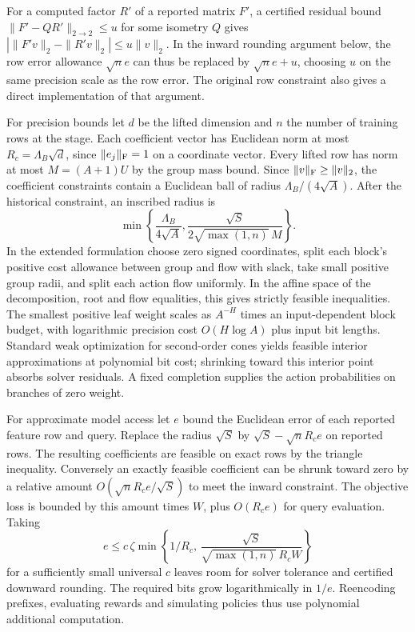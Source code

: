 For a computed factor $R'$ of a reported matrix $F'$, a certified residual bound $\|F'-QR'\|_{2\to2}\le u$ for some isometry $Q$ gives $|\|F'v\|_2-\|R'v\|_2|\le u\|v\|_2$. In the inward rounding argument below, the row error allowance $\sqrt n e$ can thus be replaced by $\sqrt n e+u$, choosing $u$ on the same precision scale as the row error. The original row constraint also gives a direct implementation of that argument.

For precision bounds let $d$ be the lifted dimension and $n$ the number of training rows at the stage. Each coefficient vector has Euclidean norm at most $R_c=\Lambda_B\sqrt d$, since $\lVert e_j\rVert_{\mathrm F}=1$ on a coordinate vector. Every lifted row has norm at most $M=(A+1)U$ by the group mass bound. Since $\lVert v\rVert_{\mathrm F}\ge\|v\|_2$, the coefficient constraints contain a Euclidean ball of radius $\Lambda_B/(4\sqrt A)$. After the historical constraint, an inscribed radius is
\[
 \min\!\left\{\frac{\Lambda_B}{4\sqrt A},
   \frac{\sqrt S}{2\sqrt{\max(1,n)}\,M}\right\}.
\]
In the extended formulation choose zero signed coordinates, split each block's positive cost allowance between group and flow with slack, take small positive group radii, and split each action flow uniformly. In the affine space of the decomposition, root and flow equalities, this gives strictly feasible inequalities. The smallest positive leaf weight scales as $A^{-H}$ times an input-dependent block budget, with logarithmic precision cost $O(H\log A)$ plus input bit lengths. Standard weak optimization for second-order cones yields feasible interior approximations at polynomial bit cost; shrinking toward this interior point absorbs solver residuals. A fixed completion supplies the action probabilities on branches of zero weight.

For approximate model access let $e$ bound the Euclidean error of each reported feature row and query. Replace the radius $\sqrt S$ by $\sqrt S-\sqrt n R_c e$ on reported rows. The resulting coefficients are feasible on exact rows by the triangle inequality. Conversely an exactly feasible coefficient can be shrunk toward zero by a relative amount $O(\sqrt n R_c e/\sqrt S)$ to meet the inward constraint. The objective loss is bounded by this amount times $W$, plus $O(R_c e)$ for query evaluation. Taking
\[
 e\le c\,\zeta\min\!\left\{1/R_c,\,
 \frac{\sqrt S}{\sqrt{\max(1,n)}\,R_cW}\right\}
\]
for a sufficiently small universal $c$ leaves room for solver tolerance and certified downward rounding. The required bits grow logarithmically in $1/e$. Reencoding prefixes, evaluating rewards and simulating policies thus use polynomial additional computation.


